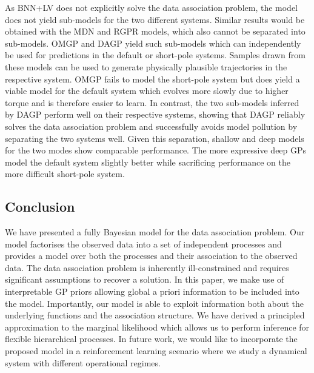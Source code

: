 As BNN+LV does not explicitly solve the data association problem, the model does not yield sub-models for the two different systems.
Similar results would be obtained with the MDN and RGPR models, which also cannot be separated into sub-models.
OMGP and DAGP yield such sub-models which can independently be used for predictions in the default or short-pole systems.
Samples drawn from these models can be used to generate physically plausible trajectories in the respective system.
OMGP fails to model the short-pole system but does yield a viable model for the default system which evolves more slowly due to higher torque and is therefore easier to learn.
In contrast, the two sub-models inferred by DAGP perform well on their respective systems, showing that DAGP reliably solves the data association problem and successfully avoids model pollution by separating the two systems well.
Given this separation, shallow and deep models for the two modes show comparable performance.
The more expressive deep GPs model the default system slightly better while sacrificing performance on the more difficult short-pole system.


\subsection{Conclusion}
\label{sub:data_association:conclusion}
We have presented a fully Bayesian model for the data association problem.
Our model factorises the observed data into a set of independent processes and provides a model over both the processes and their association to the observed data.
The data association problem is inherently ill-constrained and requires significant assumptions to recover a solution.
In this paper, we make use of interpretable GP priors allowing global a priori information to be included into the model.
Importantly, our model is able to exploit information both about the underlying functions and the association structure.
We have derived a principled approximation to the marginal likelihood which allows us to perform inference for flexible hierarchical processes.
In future work, we would like to incorporate the proposed model in a reinforcement learning scenario where we study a dynamical system with different operational regimes.


